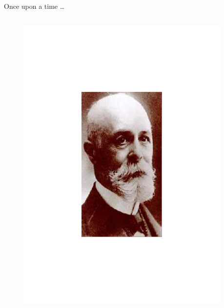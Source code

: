 \begin{frame}{Once upon a time \ldots}

\begin{columns}[T]

    \begin{column}{.5\textwidth}
    
\begin{minipage}[c][.6\textheight][c]{\linewidth}
\begin{figure}
\includegraphics[scale=0.3]{figures/20160216_rsw_becquerel.pdf}
\end{figure}    
\end{minipage}    
    
 
    \end{column}
    
    \begin{column}{.5\textwidth}
    

\end{column}
\end{columns}
\end{frame}
